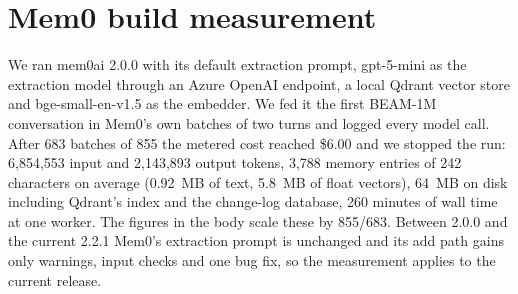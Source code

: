 \section{Mem0 build measurement}
\label{app:mem0build}

We ran mem0ai 2.0.0 with its default extraction prompt, gpt-5-mini as the extraction model through an Azure OpenAI endpoint, a local Qdrant vector store and bge-small-en-v1.5 as the embedder. We fed it the first BEAM-1M conversation in Mem0's own batches of two turns and logged every model call. After 683 batches of 855 the metered cost reached \$6.00 and we stopped the run: 6,854,553 input and 2,143,893 output tokens, 3,788 memory entries of 242 characters on average (0.92~MB of text, 5.8~MB of float vectors), 64~MB on disk including Qdrant's index and the change-log database, 260 minutes of wall time at one worker. The figures in the body scale these by 855/683. Between 2.0.0 and the current 2.2.1 Mem0's extraction prompt is unchanged and its add path gains only warnings, input checks and one bug fix, so the measurement applies to the current release.
